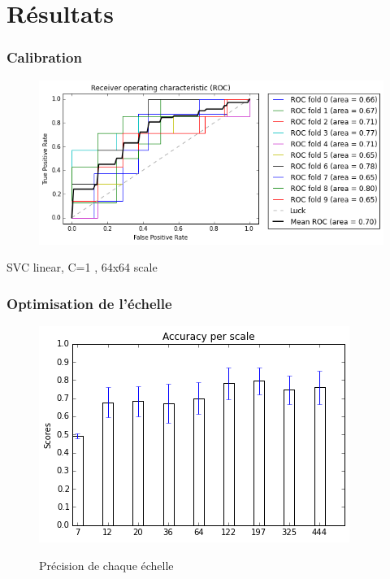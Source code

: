 \documentclass{beamer}
\begin{document}
\section{Résultats}
\frame{\sectionpage}

\begin{frame}
\frametitle{Calibration}
\begin{figure}
\begin{center}
\includegraphics[scale=.5]{../figures/svc_linear_calibration_scale64x64.png}
\end{center}
\end{figure}
\tiny{SVC linear, C=1 , 64x64 scale}
\end{frame}



\begin{frame}
\frametitle{Optimisation de l'échelle}
\begin{figure}
\begin{center}
\includegraphics[scale=0.7]{../figures/acc_scale.png}
\end{center}
\tiny{Précision de chaque échelle}
\label{fig_multiscale_cobre}
\end{figure}
\end{frame}
\end{document}
